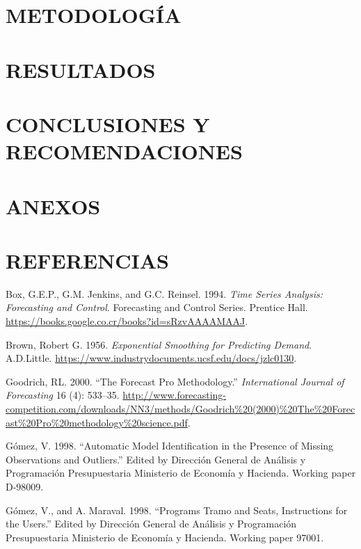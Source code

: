 \documentclass[12pt]{article}
\begin{document}
\section{METODOLOGÍA}

\section{RESULTADOS}

\section{CONCLUSIONES Y RECOMENDACIONES}

\section{ANEXOS}

\section{REFERENCIAS}

\hypertarget{refs}{}
\leavevmode\hypertarget{ref-box-jenkins}{}%
Box, G.E.P., G.M. Jenkins, and G.C. Reinsel. 1994. \emph{Time Series
Analysis: Forecasting and Control}. Forecasting and Control Series.
Prentice Hall. \url{https://books.google.co.cr/books?id=sRzvAAAAMAAJ}.

\leavevmode\hypertarget{ref-brown}{}%
Brown, Robert G. 1956. \emph{Exponential Smoothing for Predicting
Demand}. A.D.Little.
\url{https://www.industrydocuments.ucsf.edu/docs/jzlc0130}.

\leavevmode\hypertarget{ref-forecastpro}{}%
Goodrich, RL. 2000. ``The Forecast Pro Methodology.''
\emph{International Journal of Forecasting} 16 (4): 533--35.
\url{http://www.forecasting-competition.com/downloads/NN3/methods/Goodrich\%20(2000)\%20The\%20Forecast\%20Pro\%20methodology\%20science.pdf}.

\leavevmode\hypertarget{ref-gomez}{}%
Gómez, V. 1998. ``Automatic Model Identification in the Presence of
Missing Observations and Outliers.'' Edited by Dirección General de
Análisis y Programación Presupuestaria Ministerio de Economía y
Hacienda. Working paper D-98009.

\leavevmode\hypertarget{ref-tramo}{}%
Gómez, V., and A. Maraval. 1998. ``Programs Tramo and Seats,
Instructions for the Users.'' Edited by Dirección General de Análisis y
Programación Presupuestaria Ministerio de Economía y Hacienda. Working
paper 97001.
\end{document}
